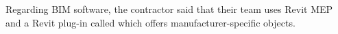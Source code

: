 Regarding BIM software, the contractor said that their team uses
Revit MEP and a Revit plug-in called  which offers manufacturer-specific objects.

